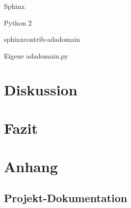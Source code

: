 \documentclass[oneside]{elaboration}
\begin{document}
Sphinx

Python 2

sphinxcontrib-adadomain

Eigene adadomain.py

\chapter{Diskussion}
\label{chp:diskussion}

\chapter{Fazit}
\label{chp:fazit}


\clearpage

\printbibliography

\appendix{}
\chapter{Anhang}
\label{chp:anhang}

\section{Projekt-Dokumentation}
\label{sec:projekt-dokumentation}
\end{document}

